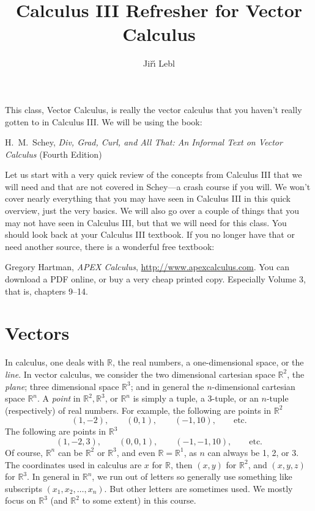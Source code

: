 \documentclass[11pt]{article}
\newcommand{\R}{{\mathbb{R}}}
\begin{document}
\title{Calculus III Refresher for Vector Calculus}
\author{Ji\v{r}\'\i{} Lebl}

\maketitle


This class, Vector Calculus, is really the vector calculus that you haven't
really gotten to in Calculus III.
We will be using the book:

\medskip

\noindent
H.\ M.\ Schey,
\emph{Div, Grad, Curl, and All That: An Informal Text on Vector Calculus} (Fourth Edition)

\medskip

Let us start with a very quick review of the concepts
from Calculus III that we will
need and that are not covered in Schey---a crash course if you will.
We won't cover nearly everything that you may have seen in Calculus III in this quick overview,
just the very basics.  We will also go over a couple of things that you may not have seen
in Calculus III, but that we will need for this class.
You should look back at your Calculus III textbook.  If you no longer have that or need another source, there is a wonderful free textbook:

\medskip

\noindent
Gregory Hartman, \emph{APEX Calculus}, \url{http://www.apexcalculus.com}.  You can download a PDF online, or buy a very cheap printed copy.  Especially Volume 3, that is, chapters 9--14.


\section{Vectors}

In calculus, one deals with $\R$, the real numbers, a one-dimensional space, or the \emph{line}.
In vector calculus, we consider the two dimensional cartesian space $\R^2$,
the \emph{plane};
three dimensional space $\R^3$; and in general the $n$-dimensional cartesian space $\R^n$.
A \emph{point} in $\R^2, \R^3$, or $\R^n$ is simply a tuple,
a 3-tuple, or an $n$-tuple (respectively) of real numbers.
For example, the following are points in $\R^2$
$$
(1,-2), \qquad (0,1), \qquad (-1,10), \qquad \text{etc.}
$$
The following are points in $\R^3$
$$
(1,-2,3), \qquad (0,0,1), \qquad (-1,-1,10), \qquad \text{etc.}
$$
Of course, $\R^n$ can be $\R^2$ or $\R^3$, and even $\R = \R^1$, as $n$ can always be
1, 2, or 3.
The coordinates used in calculus are $x$ for $\R$, then $(x,y)$ for $\R^2$, and $(x,y,z)$
for $\R^3$.
In general in $\R^n$, we run out of letters so generally use something like
subscripts $(x_1,x_2,\ldots,x_n)$.  But other letters are sometimes used.
We mostly focus on $\R^3$ (and $\R^2$ to some extent) in this course.
\end{document}

